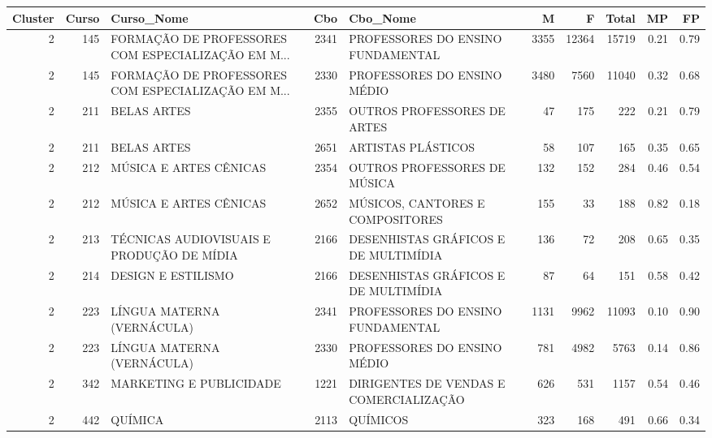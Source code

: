 \begin{tabular}{rrlrlrrrrr}
\toprule
 Cluster &  Curso &                                         Curso\_Nome &  Cbo &                                   Cbo\_Nome &    M &     F &  Total &   MP &   FP \\
\midrule
       2 &    145 & FORMAÇÃO DE PROFESSORES COM ESPECIALIZAÇÃO EM M... & 2341 &          PROFESSORES DO ENSINO FUNDAMENTAL & 3355 & 12364 &  15719 & 0.21 & 0.79 \\
       2 &    145 & FORMAÇÃO DE PROFESSORES COM ESPECIALIZAÇÃO EM M... & 2330 &                PROFESSORES DO ENSINO MÉDIO & 3480 &  7560 &  11040 & 0.32 & 0.68 \\
       2 &    211 &                                        BELAS ARTES & 2355 &                OUTROS PROFESSORES DE ARTES &   47 &   175 &    222 & 0.21 & 0.79 \\
       2 &    211 &                                        BELAS ARTES & 2651 &                         ARTISTAS PLÁSTICOS &   58 &   107 &    165 & 0.35 & 0.65 \\
       2 &    212 &                             MÚSICA E ARTES CÊNICAS & 2354 &               OUTROS PROFESSORES DE MÚSICA &  132 &   152 &    284 & 0.46 & 0.54 \\
       2 &    212 &                             MÚSICA E ARTES CÊNICAS & 2652 &           MÚSICOS, CANTORES E COMPOSITORES &  155 &    33 &    188 & 0.82 & 0.18 \\
       2 &    213 &          TÉCNICAS AUDIOVISUAIS E PRODUÇÃO DE MÍDIA & 2166 &       DESENHISTAS GRÁFICOS E DE MULTIMÍDIA &  136 &    72 &    208 & 0.65 & 0.35 \\
       2 &    214 &                                 DESIGN E ESTILISMO & 2166 &       DESENHISTAS GRÁFICOS E DE MULTIMÍDIA &   87 &    64 &    151 & 0.58 & 0.42 \\
       2 &    223 &                         LÍNGUA MATERNA (VERNÁCULA) & 2341 &          PROFESSORES DO ENSINO FUNDAMENTAL & 1131 &  9962 &  11093 & 0.10 & 0.90 \\
       2 &    223 &                         LÍNGUA MATERNA (VERNÁCULA) & 2330 &                PROFESSORES DO ENSINO MÉDIO &  781 &  4982 &   5763 & 0.14 & 0.86 \\
       2 &    342 &                            MARKETING E PUBLICIDADE & 1221 &   DIRIGENTES DE VENDAS E  COMERCIALIZAÇÃO  &  626 &   531 &   1157 & 0.54 & 0.46 \\
       2 &    442 &                                            QUÍMICA & 2113 &                                   QUÍMICOS &  323 &   168 &    491 & 0.66 & 0.34 \\

\end{tabular}

